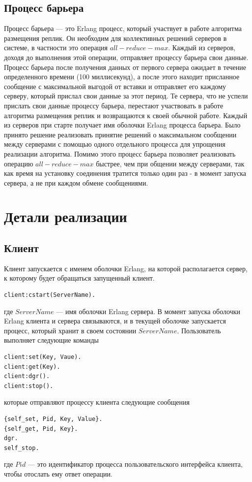 	\section{Процесс барьера}
		Процесс барьера --- это Erlang процесс, который участвует в работе алгоритма размещения реплик. Он необходим для коллективных решений серверов в системе,
		в частности это операция $all-reduce-max$. Каждый из серверов, доходя до выполнения этой операции, отправляет процессу барьера свои данные. Процесс барьера
		после получения данных от первого сервера ожидает в течение определенного времени (100 миллисекунд), а после этого находит присланное сообщение с максимальной 
		выгодой от вставки и отправляет его каждому серверу, который прислал свои данные за этот период. Те сервера, что не успели прислать свои данные процессу 
		барьера, перестают участвовать в работе алгоритма размещения реплик и возвращаются к своей обычной работе. Каждый из серверов при старте получает имя оболочки
		Erlang процесса барьера. Было принято решение реализовать принятие решений о максимальном сообщении между серверами с помощью одного отдельного процесса
		для упрощения реализации алгоритма. Помимо этого процесс барьера позволяет реализовать операцию $all-reduce-max$ быстрее, чем при общении между серверами,
		так как время на установку соединения тратится только один раз - в момент запуска сервера, а не при каждом обмене сообщениями.
		

\newpage

\chapter{Детали реализации}
	\section{Клиент}
		Клиент запускается с именем оболочки Erlang, на которой располагается сервер, к которому будет обращаться запущенный клиент.
		\begin{lstlisting}
client:cstart(ServerName).			
		\end{lstlisting}
		где $ServerName$ --- имя оболочки Erlang сервера. В момент запуска оболочки Erlang клиента и сервера связываются, и в текущей оболочке запускается процесс,
		который хранит в своем состоянии $ServerName$. Пользователь выполняет следующие команды
		\begin{lstlisting}
client:set(Key, Vaue).			
client:get(Key).			
client:dgr().			
client:stop().			
		\end{lstlisting}
		которые отправляют процессу клиента следующие сообщения
		\begin{lstlisting}
{self_set, Pid, Key, Value}.			
{self_get, Pid, Key}.			
dgr.			
self_stop.			
		\end{lstlisting}	
		где $Pid$ --- это идентификатор процесса пользовательского интерфейса клиента, чтобы отослать ему ответ операции. 
		
